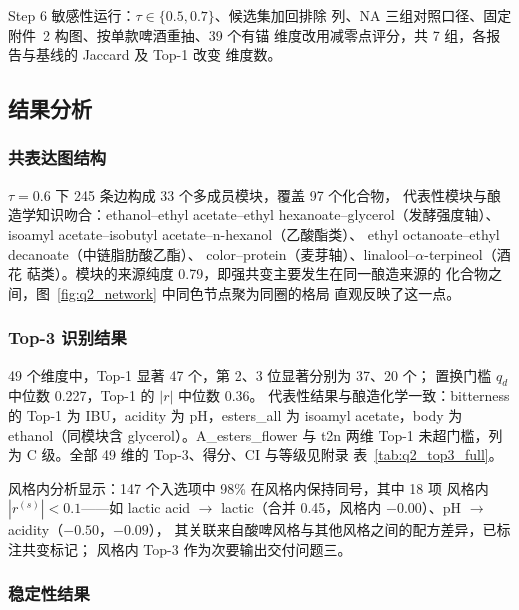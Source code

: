 \documentclass[12pt,a4paper]{article}
\begin{document}
Step 6 敏感性运行：$\tau\in\{0.5,0.7\}$、候选集加回排除
列、NA 三组对照口径、固定附件~2 构图、按单款啤酒重抽、39 个有锚
维度改用减零点评分，共 7 组，各报告与基线的 Jaccard 及 Top-1 改变
维度数。

\subsection{结果分析}

\subsubsection{共表达图结构}

$\tau=0.6$ 下 245 条边构成 33 个多成员模块，覆盖 97 个化合物，
代表性模块与酿造学知识吻合：ethanol--ethyl acetate--ethyl hexanoate--glycerol（发酵强度轴）、
isoamyl acetate--isobutyl acetate--n-hexanol（乙酸酯类）、
ethyl octanoate--ethyl decanoate（中链脂肪酸乙酯）、
color--protein（麦芽轴）、linalool--$\alpha$-terpineol（酒花
萜类）。模块的来源纯度 0.79，即强共变主要发生在同一酿造来源的
化合物之间，图~\ref{fig:q2_network} 中同色节点聚为同圈的格局
直观反映了这一点。


\subsubsection{Top-3 识别结果}

49 个维度中，Top-1 显著 47 个，第 2、3 位显著分别为 37、20 个；
置换门槛 $q_d$ 中位数 0.227，Top-1 的 $|r|$ 中位数 0.36。
代表性结果与酿造化学一致：bitterness 的 Top-1 为 IBU，acidity 为
pH，esters\_all 为 isoamyl acetate，body 为 ethanol（同模块含
glycerol）。A\_esters\_flower 与 t2n 两维 Top-1 未超门槛，列为
C 级。全部 49 维的 Top-3、得分、CI 与等级见附录
表~\ref{tab:q2_top3_full}。

风格内分析显示：147 个入选项中 98\% 在风格内保持同号，其中 18 项
风格内 $|r^{(s)}|<0.1$——如 lactic acid $\to$ lactic（合并
0.45，风格内 $-0.00$）、pH $\to$ acidity（$-0.50$，$-0.09$），
其关联来自酸啤风格与其他风格之间的配方差异，已标注共变标记；
风格内 Top-3 作为次要输出交付问题三。

\subsubsection{稳定性结果}
\end{document}
